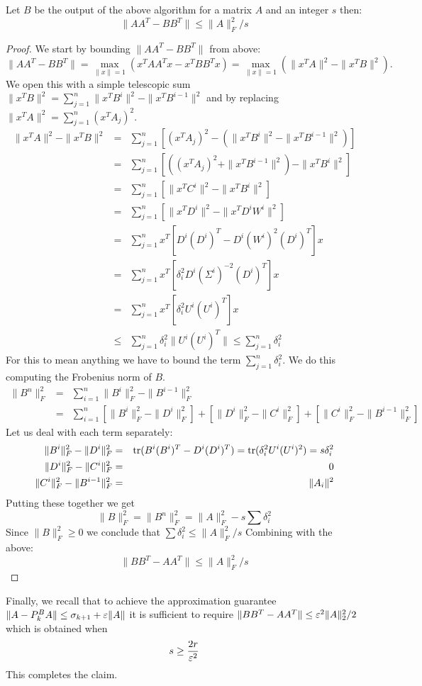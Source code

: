 \begin{lemma}
Let $B$ be the output of the above algorithm for a matrix $A$ and an integer $s$ then:
\[
\|AA^T - BB^T\| \le \|A\|_F^2/s
\]
\end{lemma}
\begin{proof}
We start by bounding $\|AA^T - BB^T\|$ from above:
\[
\|AA^T - BB^T\| = \max_{\|x\|=1} (x^TAA^Tx - x^TBB^Tx) = \max_{\|x\|=1} (\|x^TA\|^2 - \|x^TB\|^2).
\]
We open this with a simple telescopic sum $\|x^TB\|^2 = \sum_{j=1}^{n}\|x^TB^{i}\|^2 - \|x^TB^{i-1}\|^2$ and by replacing $\|x^TA\|^2 = \sum_{j=1}^{n}(x^TA_j)^2$.
\begin{eqnarray}
\|x^TA\|^2 - \|x^TB\|^2 &=& \sum_{j=1}^{n} [ (x^TA_j)^2  - (\|x^TB^{i}\|^2 - \|x^TB^{i-1}\|^2)]\\
&=& \sum_{j=1}^{n} [ ((x^TA_j)^2  + \|x^TB^{i-1}\|^2)   - \|x^TB^{i}\|^2 ]\\
&=& \sum_{j=1}^{n} [ \|x^TC^{i}\|^2   - \|x^TB^{i}\|^2 ]\\
&=& \sum_{j=1}^{n} [ \|x^TD^{i}\|^2   - \|x^TD^{i}W^{i}\|^2 ]\\
&=& \sum_{j=1}^{n}  x^T[D^{i}(D^{i})^{T}   - D^{i}(W^{i})^{2}(D^{i})^{T}]x \\
&=& \sum_{j=1}^{n}  x^T[\delta_{i}^2 D^{i} (\Sigma^{i})^{-2}(D^{i})^T]x \\
&=& \sum_{j=1}^{n}  x^T[\delta_{i}^2 U^{i}(U^{i})^T]x \\
&\le& \sum_{j=1}^{n} \delta_{i}^2 \|U^{i}(U^{i})^T\| \le \sum_{j=1}^{n} \delta_{i}^2
\end{eqnarray}
%
\noindent For this to mean anything we have to bound the term $\sum_{j=1}^{n} \delta_{i}^2$. We do this computing the Frobenius norm of $B$.
\begin{eqnarray}
\|B^{n}\|_{F}^{2} &=& \sum_{i=1}^{n} \|B^{i}\|_{F}^{2} - \|B^{i-1}\|_{F}^{2}\\
&=& \sum_{i=1}^{n} [\|B^{i}\|_{F}^{2} - \|D^{i}\|_{F}^{2}] + [\|D^{i}\|_{F}^{2} - \|C^{i}\|_{F}^{2}] + [\|C^{i}\|_{F}^{2} -  \|B^{i-1}\|_{F}^{2}]
\end{eqnarray}
Let us deal with each term separately: 
\begin{eqnarray}
\|B^{i}\|_{F}^{2} - \|D^{i}\|_{F}^{2} &=& \operatorname{tr}(B^{i}(B^{i})^{T} - D^{i}(D^{i})^{T}) = \operatorname{tr}(\delta^2_i U^{i}(U^{i})^2) = s\delta^2_i\\
\|D^{i}\|_{F}^{2} - \|C^{i}\|_{F}^{2} &=& 0\\
\|C^{i}\|_{F}^{2} -  \|B^{i-1}\|_{F}^{2} &=& \|A_i\|^2
\end{eqnarray}
Putting these together we get 
\[
\|B\|_{F}^{2} = \|B^{n}\|_{F}^{2}  = \|A\|_F^2 - s \sum \delta_{i}^2
\]
Since $\|B\|_{F}^{2} \ge 0$ we conclude that $\sum \delta_{i}^2 \le \|A\|_F^2/s$
Combining with the above:
\[
\|BB^T - AA^T\| \le \|A\|_F^2/s
\]
\end{proof}
\noindent Finally, we recall that to achieve the approximation guarantee
$\|A - P_k^BA\| \le \sigma_{k+1} + \varepsilon\|A\|$ it is sufficient to require $\|BB^T - AA^T\| \le \varepsilon^2\|A\|_2^2/2$ which is obtained when
\[
s \ge \frac{2r}{\varepsilon^2}
\]
This completes the claim.
